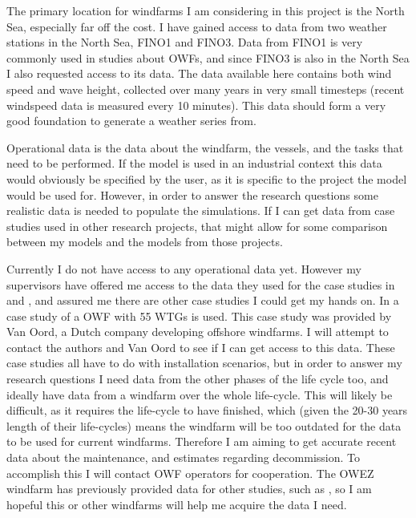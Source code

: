 \documentclass[a4paper,12pt]{article}
\begin{document}
The primary location for windfarms I am considering in this project is the North Sea, especially far off the cost. I have gained access to data from two weather stations in the North Sea, FINO1 and FINO3. Data from FINO1 is very commonly used in studies about OWFs, and since FINO3 is also in the North Sea I also requested access to its data. The data available here contains both wind speed and wave height, collected over many years in very small timesteps (recent windspeed data is measured every 10 minutes). This data should form a very good foundation to generate a weather series from. 

\bigskip

Operational data is the data about the windfarm, the vessels, and the tasks that need to be performed. If the model is used in an industrial context this data would obviously be specified by the user, as it is specific to the project the model would be used for. However, in order to answer the research questions some realistic data is needed to populate the simulations. If I can get data from case studies used in other research projects, that might allow for some comparison between my models and the models from those projects. 

Currently I do not have access to any operational data yet. However my supervisors have offered me access to the data they used for the case studies in \cite{barlow2018mixed} and \cite{barlow2017using}, and assured me there are other case studies I could get my hands on. In \cite{leontaris2016probabilistic} a case study of a OWF with 55 WTGs is used. This case study was provided by Van Oord, a Dutch company developing offshore windfarms. I will attempt to contact the authors and Van Oord to see if I can get access to this data. These case studies all have to do with installation scenarios, but in order to answer my research questions I need data from the other phases of the life cycle too, and ideally have data from a windfarm over the whole life-cycle. This will likely be difficult, as it requires the life-cycle to have finished, which (given the 20-30 years length of their life-cycles) means the windfarm will be too outdated for the data to be used for current windfarms. Therefore I am aiming to get accurate recent data about the maintenance, and estimates regarding decommission. To accomplish this I will contact OWF operators for cooperation. The OWEZ windfarm has previously provided data for other studies, such as \cite{dinwoodie2012analysis}, so I am hopeful this or other windfarms will help me acquire the data I need. 
\end{document}
